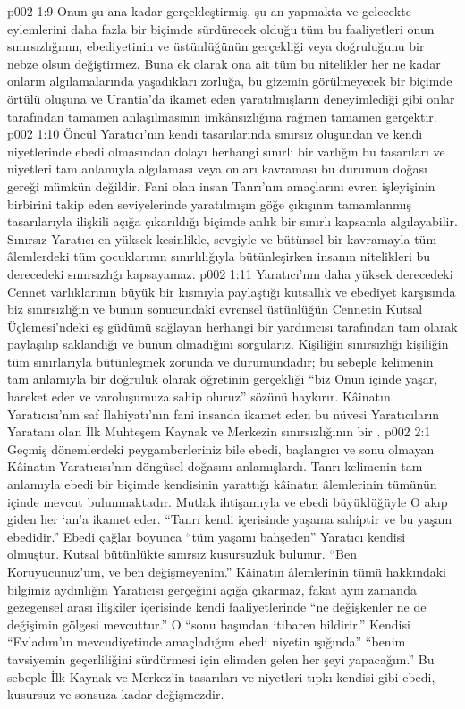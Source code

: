 \vs p002 1:9 Onun şu ana kadar gerçekleştirmiş, şu an yapmakta ve gelecekte eylemlerini daha fazla bir biçimde sürdürecek olduğu tüm bu faaliyetleri onun sınırsızlığının, ebediyetinin ve üstünlüğünün gerçekliği veya doğruluğunu bir nebze olsun değiştirmez. Buna ek olarak ona ait tüm bu nitelikler her ne kadar onların algılamalarında yaşadıkları zorluğa, bu gizemin görülmeyecek bir biçimde örtülü oluşuna ve Urantia’da ikamet eden yaratılmışların deneyimlediği gibi onlar tarafından tamamen anlaşılmasının imkânsızlığına rağmen tamamen gerçektir.
\vs p002 1:10 Öncül Yaratıcı’nın kendi tasarılarında sınırsız oluşundan ve kendi niyetlerinde ebedi olmasından dolayı herhangi sınırlı bir varlığın bu tasarıları ve niyetleri tam anlamıyla algılaması veya onları kavraması bu durumun doğası gereği mümkün değildir. Fani olan insan Tanrı’nın amaçlarını evren işleyişinin birbirini takip eden seviyelerinde yaratılmışın göğe çıkışının tamamlanmış tasarılarıyla ilişkili açığa çıkarıldığı biçimde anlık bir sınırlı kapsamla algılayabilir. Sınırsız Yaratıcı en yüksek kesinlikle, sevgiyle ve bütünsel bir kavramayla tüm âlemlerdeki tüm çocuklarının sınırlılığıyla bütünleşirken insanın nitelikleri bu derecedeki sınırsızlığı kapsayamaz.
\vs p002 1:11 Yaratıcı’nın daha yüksek derecedeki Cennet varlıklarının büyük bir kısmıyla paylaştığı kutsallık ve ebediyet karşısında biz sınırsızlığın ve bunun sonucundaki evrensel üstünlüğün Cennetin Kutsal Üçlemesi’ndeki eş güdümü sağlayan herhangi bir yardımcısı tarafından tam olarak paylaşılıp saklandığı ve bunun olmadığını sorgularız. Kişiliğin sınırsızlığı kişiliğin tüm sınırlarıyla bütünleşmek zorunda ve durumundadır; bu sebeple kelimenin tam anlamıyla bir doğruluk olarak öğretinin gerçekliği “biz Onun içinde yaşar, hareket eder ve varoluşumuza sahip oluruz” sözünü haykırır. Kâinatın Yaratıcısı’nın saf İlahiyatı’nın fani insanda ikamet eden bu nüvesi Yaratıcıların Yaratanı olan İlk Muhteşem Kaynak ve Merkezin sınırsızlığının bir .
\vs p002 2:1 Geçmiş dönemlerdeki peygamberleriniz bile ebedi, başlangıcı ve sonu olmayan Kâinatın Yaratıcısı’nın döngüsel doğasını anlamışlardı. Tanrı kelimenin tam anlamıyla ebedi bir biçimde kendisinin yarattığı kâinatın âlemlerinin tümünün içinde mevcut bulunmaktadır. Mutlak ihtişamıyla ve ebedi büyüklüğüyle O akıp giden her ‘an’a ikamet eder. “Tanrı kendi içerisinde yaşama sahiptir ve bu yaşam ebedidir.” Ebedi çağlar boyunca “tüm yaşamı bahşeden” Yaratıcı kendisi olmuştur. Kutsal bütünlükte sınırsız kusursuzluk bulunur. “Ben Koruyucunuz’um, ve ben değişmeyenim.” Kâinatın âlemlerinin tümü hakkındaki bilgimiz aydınlığın Yaratıcısı gerçeğini açığa çıkarmaz, fakat aynı zamanda gezegensel arası ilişkiler içerisinde kendi faaliyetlerinde “ne değişkenler ne de değişimin gölgesi mevcuttur.” O “sonu başından itibaren bildirir.” Kendisi “Evladım’ın mevcudiyetinde amaçladığım ebedi niyetin ışığında” “benim tavsiyemin geçerliliğini sürdürmesi için elimden gelen her şeyi yapacağım.” Bu sebeple İlk Kaynak ve Merkez’in tasarıları ve niyetleri tıpkı kendisi gibi ebedi, kusursuz ve sonsuza kadar değişmezdir.
